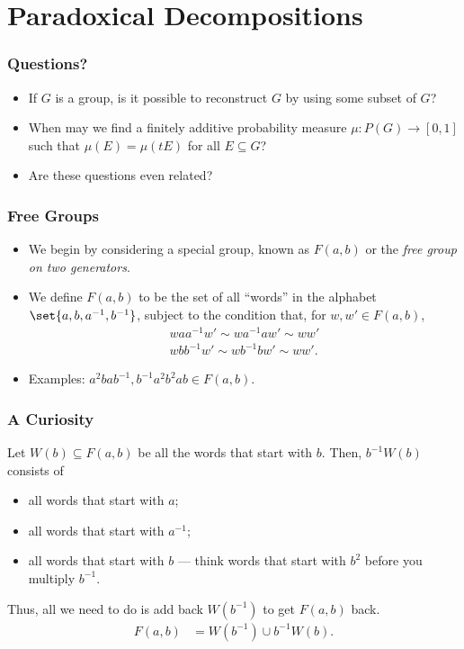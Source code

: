 \documentclass{beamer-custom}
\begin{document}
\section{Paradoxical Decompositions}%
\begin{frame}
  \frametitle{Questions?}
  \begin{itemize}
    \item If $G$ is a group, is it possible to reconstruct $G$ by using some subset of $G$?
    \item When may we find a finitely additive probability measure $\mu\colon P(G)\rightarrow [0,1]$ such that $\mu\left( E \right) = \mu\left( tE \right)$ for all $E\subseteq G$?
    \item Are these questions even related?
  \end{itemize}
\end{frame}
\begin{frame}
  \frametitle{Free Groups}
  \begin{itemize}
    \item We begin by considering a special group, known as $F(a,b)$ or the \textit{free group on two generators}.\pause
    \item We define $F(a,b)$ to be the set of all ``words'' in the alphabet $\set{a,b,a^{-1},b^{-1}}$, subject to the condition that, for $w,w'\in F(a,b)$,
      \begin{align*}
        waa^{-1}w' \sim wa^{-1}aw' \sim ww'\\
        wbb^{-1}w' \sim wb^{-1}bw' \sim ww'.
      \end{align*}
    \item Examples: $a^2bab^{-1},b^{-1}a^2b^2ab\in F(a,b)$.
  \end{itemize}
\end{frame}
\begin{frame}
  \frametitle{A Curiosity}
  Let $W(b)\subseteq F(a,b)$ be all the words that start with $b$. Then, $b^{-1}W(b)$ consists of \pause
  \begin{itemize}
    \item all words that start with $a$;
    \item all words that start with $a^{-1}$;
    \item all words that start with $b$ --- think words that start with $b^2$ before you multiply $b^{-1}$.\pause
  \end{itemize}
  Thus, all we need to do is add back $W\left( b^{-1} \right)$ to get $F(a,b)$ back.
  \begin{align*}
    F(a,b) &= W\left( b^{-1} \right)\cup b^{-1}W(b).
  \end{align*}
\end{frame}
\end{document}
